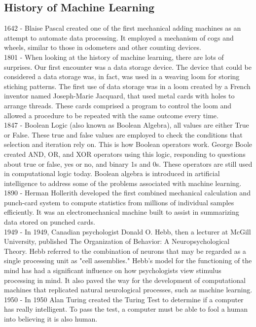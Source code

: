 \documentclass[english,12pt,oneside,a4paper]{article}
\begin{document}
\begin{center}
		\subsection{History of Machine Learning}
		1642 - Blaise Pascal created one of the first mechanical adding machines as an attempt to automate data processing. It employed a mechanism of cogs and wheels, similar to those in odometers and other counting devices.\\
		1801 - When looking at the history of machine learning, there are lots of surprises. Our first encounter was a data storage device. The device that could be considered a data storage was, in fact, was used in a weaving loom for storing stiching patterns. The first use of data storage was in a loom created by a French inventor named Joseph-Marie Jacquard, that used metal cards with holes to arrange threads. These cards comprised a program to control the loom and allowed a procedure to be repeated with the same outcome every time.\\
		1847 - Boolean Logic (also known as Boolean Algebra), all values are either True or False. These true and false values are employed to check the conditions that selection and iteration rely on. This is how Boolean operators work. George Boole created AND, OR, and XOR operators using this logic, responding to questions about true or false, yes or no, and binary 1s and 0s. These operators are still used in computational logic today.
		Boolean algebra is introduced in artificial intelligence to address some of the problems associated with machine learning.\\
		1890 - Herman Hollerith developed the first combined mechanical calculation and punch-card system to compute statistics from millions of individual samples efficiently. It was an electromechanical machine built to assist in summarizing data stored on punched cards.\\
		1949 - In 1949, Canadian psychologist Donald O. Hebb, then a lecturer at McGill University, published The Organization of Behavior: A Neuropsychological Theory. Hebb referred to the combination of neurons that may be regarded as a single processing unit as "cell assemblies."
		Hebb's model for the functioning of the mind has had a significant influence on how psychologists view stimulus processing in mind. It also paved the way for the development of computational machines that replicated natural neurological processes, such as machine learning.\\
		1950 - In 1950 Alan Turing created the Turing Test to determine if a computer has really intelligent. To pass the test, a computer must be able to fool a human into believing it is also human.

\end{center}
\end{document}
